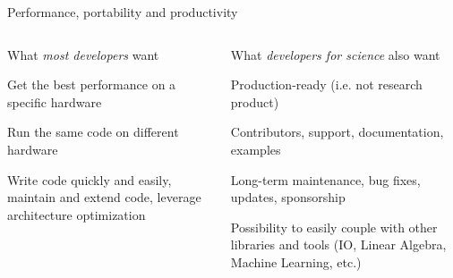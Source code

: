 \documentclass[
    aspectratio=169,
    handout,
]{beamer}
\begin{document}
\begin{frame}{Performance, portability and productivity}
    \begin{columns}[T]
        \begin{column}{0.45\linewidth}
            What \emph{most developers} want

            \vspace{1em}

            \begin{description}[Performance]
                \item[Performance] Get the best performance on a specific hardware
                \item[Portability] Run the same code on different hardware
                \item[Productivity] Write code quickly and easily, maintain and extend code, leverage architecture optimization
            \end{description}
        \end{column}
        \begin{column}{0.55\linewidth}
            What \emph{developers for science} also want

            \vspace{1em}

            \begin{description}[Interporability]
                \item[Maturity] Production-ready (i.e. not research product)
                \item[Community] Contributors, support, documentation, examples
                \item[Longevity] Long-term maintenance, bug fixes, updates, sponsorship
                \item[Interporability] Possibility to easily couple with other libraries and tools (IO, Linear Algebra, Machine Learning, etc.)
            \end{description}
        \end{column}
    \end{columns}
\end{frame}

\end{document}
